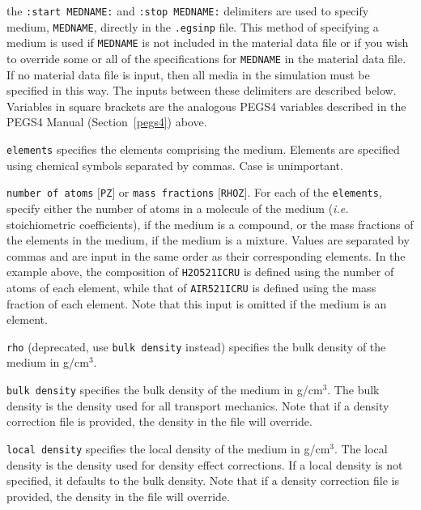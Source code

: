 \documentclass[12pt,twoside]{article}  %
\begin{document}
\begin{description}
\item the {\tt :start MEDNAME:} and {\tt :stop MEDNAME:} delimiters are used to specify medium, {\tt MEDNAME}, directly in the
{\tt .egsinp} file.  This method of specifying a medium is used if {\tt MEDNAME} is not included in the material data file or
if you wish to override some or all of the specifications for {\tt MEDNAME} in the material data file.
If no material data file is input, then all media in the simulation
must be specified in this way.  The inputs between these delimiters are described below.  Variables
in square brackets are the analogous PEGS4 variables described in the PEGS4 Manual (Section~\ref{pegs4}) above.
\begin{description}
\item {\tt elements} specifies the elements comprising the medium.  Elements are specified using chemical symbols separated by
commas.  Case is unimportant.
\item {\tt number of atoms} $[${\tt PZ}$]$ or {\tt mass fractions} $[${\tt RHOZ}$]$.  For each of the {\tt elements}, specify either the number of atoms in a molecule of the medium ({\it i.e.} stoichiometric coefficients), if the
medium is a compound, or the mass fractions of the elements in the medium,
if the medium is a mixture.
Values are separated by commas and are input in the same order as their corresponding elements.  In the example above,
the composition of {\tt H2O521ICRU} is
defined using the number of atoms of each element, while that of {\tt AIR521ICRU} is defined using the mass fraction of each element.  Note that this input
is omitted if the medium is an element.
\item {\tt rho} (deprecated, use {\tt bulk density} instead) specifies the bulk density of the medium in g/cm$^3$.
\item {\tt bulk density} specifies the bulk density of the medium in g/cm$^3$. The bulk density is the density used for all transport mechanics. Note that if a density correction file is provided, the density in the file will override.
\item {\tt local density} specifies the local density of the medium in g/cm$^3$. The local density is the density used for density effect corrections. If a local density is not specified, it defaults to the bulk density. Note that if a density correction file is provided, the density in the file will override.

\end{description}
\end{description}
\end{document}
